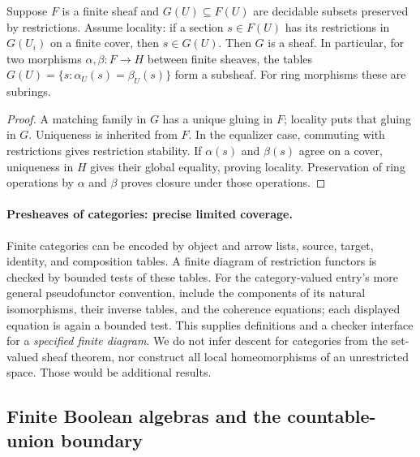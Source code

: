 \begin{proposition}
Suppose $F$ is a finite sheaf and $G(U)\subseteq F(U)$ are decidable
subsets preserved by restrictions.  Assume locality: if a section
$s\in F(U)$ has its restrictions in $G(U_i)$ on a finite cover, then
$s\in G(U)$.  Then $G$ is a sheaf.  In particular, for two morphisms
$\alpha,\beta:F\to H$ between finite sheaves, the tables
$G(U)=\{s:\alpha_U(s)=\beta_U(s)\}$ form a subsheaf.  For ring
morphisms these are subrings.
\end{proposition}
\begin{proof}
A matching family in $G$ has a unique gluing in $F$; locality puts that
gluing in $G$.  Uniqueness is inherited from $F$.  In the equalizer
case, commuting with restrictions gives restriction stability.  If
$\alpha(s)$ and $\beta(s)$ agree on a cover, uniqueness in $H$ gives
their global equality, proving locality.  Preservation of ring operations
by $\alpha$ and $\beta$ proves closure under those operations.
\end{proof}

\paragraph{Presheaves of categories: precise limited coverage.}
Finite categories can be encoded by object and arrow lists, source,
target, identity, and composition tables.  A finite diagram of restriction
functors is checked by bounded tests of these tables.  For the
category-valued entry's more general pseudofunctor convention, include
the components of its natural isomorphisms, their inverse tables, and
the coherence equations; each displayed equation is again a bounded
test.  This supplies definitions and a checker interface for a
\emph{specified finite diagram}.  We do not infer descent for categories
from the set-valued sheaf theorem, nor construct all local homeomorphisms
of an unrestricted space.  Those would be additional results.

\subsection{Finite Boolean algebras and the countable-union boundary}

